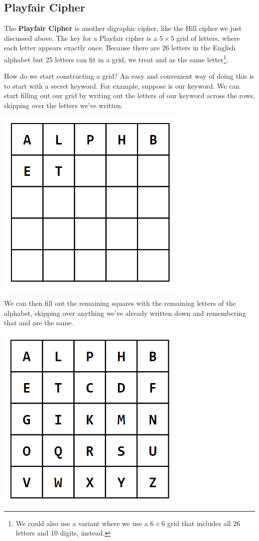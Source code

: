 \documentclass[letterpaper]{article}
\begin{document}
\subsection{Playfair Cipher}
The \textbf{Playfair Cipher} is another digraphic cipher, like the Hill cipher we just discussed above. The key for a Playfair cipher is a $5 \times 5$ grid of letters, where each letter appears exactly once. Because there are 26 letters in the English alphabet but 25 letters can fit in a grid, we treat  and  as the same letter\footnote{We could also use a variant where we use a $6 \times 6$ grid that includes all 26 letters and 10 digits, instead.}. 

\bigskip 

How do we start constructing a grid? An easy and convenient way of doing this is to start with a secret keyword. For example, suppose  is our keyword. We can start filling out our grid by writing out the letters of our keyword across the rows, skipping over the letters we've written.
\begin{center}
    \includegraphics[scale=0.5]{../assets/playfair_1.png}
\end{center}
We can then fill out the remaining squares with the remaining letters of the alphabet, skipping over anything we've already written down and remembering that  and  are the same. 
\begin{center}
    \includegraphics[scale=0.5]{../assets/playfair_2.png}
\end{center}
\end{document}
